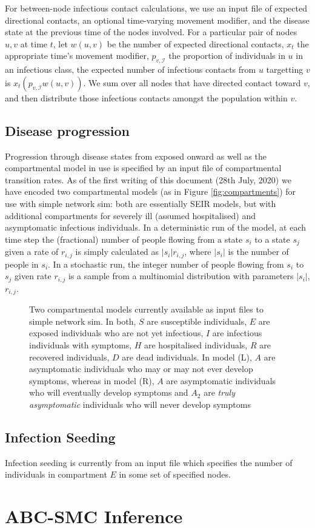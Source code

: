 \documentclass[11pt]{article}
\begin{document}
For between-node infectious contact calculations, we use an input file of expected directional contacts, an optional time-varying movement modifier, and the disease state at the previous time of the nodes involved.  For a particular pair of nodes $u, v$ at time $t$, let $w(u, v)$ be the number of expected directional contacts, $x_t$ the appropriate time's movement modifier, $p_{v,\mathcal{I}}$ the proportion of individuals in $u$ in an infectious class, the expected number of infectious contacts from $u$ targetting $v$ is $x_t(p_{v,\mathcal{I}}w(u, v))$.  We sum over all nodes that have directed contact toward $v$, and then distribute those infectious contacts amongst the population within $v$.

\subsection{Disease progression}
Progression through disease states from exposed onward as well as the compartmental model in use is specified by an input file of compartmental transition rates.   As of the first writing of this document (28th July, 2020) we have encoded two compartmental models (as in Figure \ref{fig:compartments}) for use with simple network sim: both are essentially SEIR models, but with additional compartments for severely ill (assumed hospitalised) and asymptomatic infectious individuals.  In a deterministic run of the model, at each time step the (fractional) number of people flowing from a state $s_i$ to a state $s_j$ given a rate of $r_{i,j}$ is simply calculated as $|s_i|r_{i,j}$, where $|s_i|$ is the number of people in $s_i$.  In a stochastic run, the integer number of people flowing from $s_i$ to $s_j$ given rate $r_{i,j}$ is a sample from a multinomial distribution with parameters $|s_i|$, $r_{i,j}$.

\begin{figure}[h!]
\caption{Two compartmental models currently available as input files to simple network sim.  In both, $S$ are susceptible individuals, $E$ are exposed individuals who are not yet infectious, $I$ are infectious individuals with symptoms,  $H$ are hospitalised individuals, $R$ are recovered individuals, $D$ are dead individuals. In model (L), $A$  are asymptomatic individuals who may or may not ever develop symptoms, whereas in model (R), $A$ are asymptomatic individuals who will eventually develop symptoms and \textbf{$A_2$} are \emph{truly asymptomatic} individuals who will never develop symptoms}
\end{figure}


\subsection{Infection Seeding}
Infection seeding is currently from an input file which specifies the number of individuals in compartment $E$ in some set of specified nodes.  

\section{ABC-SMC Inference}
\end{document}
